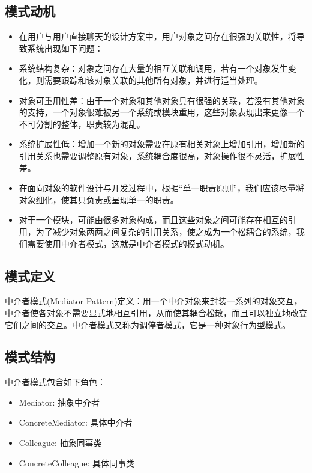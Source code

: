 \documentclass[letterpaper,10pt,english]{sphinxmanual}
\begin{document}
\subsection{模式动机}
\label{\detokenize{behavioral_patterns/mediator:id3}}\begin{itemize}
\item {} 
\sphinxAtStartPar
在用户与用户直接聊天的设计方案中，用户对象之间存在很强的关联性，将导致系统出现如下问题：

\item {} 
\sphinxAtStartPar
系统结构复杂：对象之间存在大量的相互关联和调用，若有一个对象发生变化，则需要跟踪和该对象关联的其他所有对象，并进行适当处理。

\item {} 
\sphinxAtStartPar
对象可重用性差：由于一个对象和其他对象具有很强的关联，若没有其他对象的支持，一个对象很难被另一个系统或模块重用，这些对象表现出来更像一个不可分割的整体，职责较为混乱。

\item {} 
\sphinxAtStartPar
系统扩展性低：增加一个新的对象需要在原有相关对象上增加引用，增加新的引用关系也需要调整原有对象，系统耦合度很高，对象操作很不灵活，扩展性差。

\item {} 
\sphinxAtStartPar
在面向对象的软件设计与开发过程中，根据“单一职责原则”，我们应该尽量将对象细化，使其只负责或呈现单一的职责。

\item {} 
\sphinxAtStartPar
对于一个模块，可能由很多对象构成，而且这些对象之间可能存在相互的引用，为了减少对象两两之间复杂的引用关系，使之成为一个松耦合的系统，我们需要使用中介者模式，这就是中介者模式的模式动机。

\end{itemize}


\subsection{模式定义}
\label{\detokenize{behavioral_patterns/mediator:id4}}
\sphinxAtStartPar
中介者模式(Mediator Pattern)定义：用一个中介对象来封装一系列的对象交互，中介者使各对象不需要显式地相互引用，从而使其耦合松散，而且可以独立地改变它们之间的交互。中介者模式又称为调停者模式，它是一种对象行为型模式。


\subsection{模式结构}
\label{\detokenize{behavioral_patterns/mediator:id5}}
\sphinxAtStartPar
中介者模式包含如下角色：
\begin{itemize}
\item {} 
\sphinxAtStartPar
Mediator: 抽象中介者

\item {} 
\sphinxAtStartPar
ConcreteMediator: 具体中介者

\item {} 
\sphinxAtStartPar
Colleague: 抽象同事类

\item {} 
\sphinxAtStartPar
ConcreteColleague: 具体同事类

\end{itemize}
\end{document}
